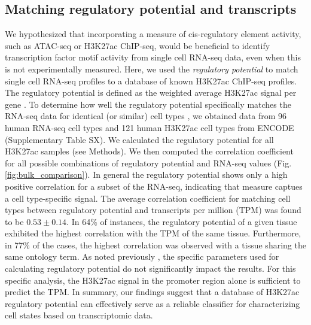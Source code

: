 \subsection{Matching regulatory potential and transcripts}

We hypothesized that incorporating a measure of cis-regulatory element activity, such as ATAC-seq or H3K27ac ChIP-seq, would be beneficial to identify transcription factor motif activity from single cell RNA-seq data, even when this is not experimentally measured. Here, we used the \textit{regulatory potential} to match single cell RNA-seq profiles to a database of known H3K27ac ChIP-seq profiles. The regulatory potential is defined as the weighted average H3K27ac signal per gene \cite{Wang2016}.  To determine how well the  regulatory potential specifically matches the RNA-seq data for identical (or similar) cell types , we obtained data from 96 human RNA-seq cell types and 121 human H3K27ac cell types from ENCODE\cite{encode_dcc}  (Supplementary Table SX). We calculated the regulatory potential for all H3K27ac samples (see Methods). We then computed the correlation coefficient for all possible combinations of regulatory potential and RNA-seq values (Fig. \ref{fig:bulk_comparison}). In general the regulatory potential shows only  a high positive correlation for a subset of the RNA-seq, indicating that measure captues a cell type-specific signal. The average correlation coefficient for matching cell types between regulatory potential and transcripts per million (TPM) was found to be $0.53 \pm 0.14$. In 64\% of instances, the regulatory potential of a given tissue exhibited the highest correlation with the TPM of the same tissue. Furthermore, in 77\% of the cases, the highest correlation was observed with a tissue sharing the same ontology term. As noted previously \cite{Wang2016},  the specific parameters used for calculating regulatory potential do not significantly impact the results. For this specific analysis, the H3K27ac signal in the promoter region alone is sufficient to predict the TPM. In summary, our findings suggest that a database of H3K27ac regulatory potential can effectively serve as a reliable classifier for characterizing cell states based on transcriptomic data.

